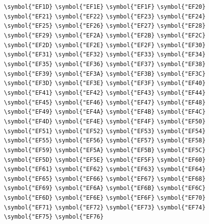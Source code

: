\documentclass{ctexbook}
\begin{document}
{\verb|\symbol{"EF1D}|  \verb|\symbol{"EF1E}|  \verb|\symbol{"EF1F}|  \verb|\symbol{"EF20}|  \verb|\symbol{"EF21}|  \verb|\symbol{"EF22}|  \verb|\symbol{"EF23}|  \verb|\symbol{"EF24}|  \verb|\symbol{"EF25}|  \verb|\symbol{"EF26}|  \verb|\symbol{"EF27}|  \verb|\symbol{"EF28}|  \verb|\symbol{"EF29}|  \verb|\symbol{"EF2A}|  \verb|\symbol{"EF2B}|  \verb|\symbol{"EF2C}|  \verb|\symbol{"EF2D}|  \verb|\symbol{"EF2E}|  \verb|\symbol{"EF2F}|  \verb|\symbol{"EF30}|  \verb|\symbol{"EF31}|  \verb|\symbol{"EF32}|  \verb|\symbol{"EF33}|  \verb|\symbol{"EF34}|  \verb|\symbol{"EF35}|  \verb|\symbol{"EF36}|  \verb|\symbol{"EF37}|  \verb|\symbol{"EF38}|  \verb|\symbol{"EF39}|  \verb|\symbol{"EF3A}|  \verb|\symbol{"EF3B}|  \verb|\symbol{"EF3C}|  \verb|\symbol{"EF3D}|  \verb|\symbol{"EF3E}|  \verb|\symbol{"EF3F}|  \verb|\symbol{"EF40}|  \verb|\symbol{"EF41}|  \verb|\symbol{"EF42}|  \verb|\symbol{"EF43}|  \verb|\symbol{"EF44}|  \verb|\symbol{"EF45}|  \verb|\symbol{"EF46}|  \verb|\symbol{"EF47}|  \verb|\symbol{"EF48}|  \verb|\symbol{"EF49}|  \verb|\symbol{"EF4A}|  \verb|\symbol{"EF4B}|  \verb|\symbol{"EF4C}|  \verb|\symbol{"EF4D}|  \verb|\symbol{"EF4E}|  \verb|\symbol{"EF4F}|  \verb|\symbol{"EF50}|  \verb|\symbol{"EF51}|  \verb|\symbol{"EF52}|  \verb|\symbol{"EF53}|  \verb|\symbol{"EF54}|  \verb|\symbol{"EF55}|  \verb|\symbol{"EF56}|  \verb|\symbol{"EF57}|  \verb|\symbol{"EF58}|  \verb|\symbol{"EF59}|  \verb|\symbol{"EF5A}|  \verb|\symbol{"EF5B}|  \verb|\symbol{"EF5C}|  \verb|\symbol{"EF5D}|  \verb|\symbol{"EF5E}|  \verb|\symbol{"EF5F}|  \verb|\symbol{"EF60}|  \verb|\symbol{"EF61}|  \verb|\symbol{"EF62}|  \verb|\symbol{"EF63}|  \verb|\symbol{"EF64}|  \verb|\symbol{"EF65}|  \verb|\symbol{"EF66}|  \verb|\symbol{"EF67}|  \verb|\symbol{"EF68}|  \verb|\symbol{"EF69}|  \verb|\symbol{"EF6A}|  \verb|\symbol{"EF6B}|  \verb|\symbol{"EF6C}|  \verb|\symbol{"EF6D}|  \verb|\symbol{"EF6E}|  \verb|\symbol{"EF6F}|  \verb|\symbol{"EF70}|  \verb|\symbol{"EF71}|  \verb|\symbol{"EF72}|  \verb|\symbol{"EF73}|  \verb|\symbol{"EF74}|  \verb|\symbol{"EF75}|  \verb|\symbol{"EF76}|  }
\end{document}
